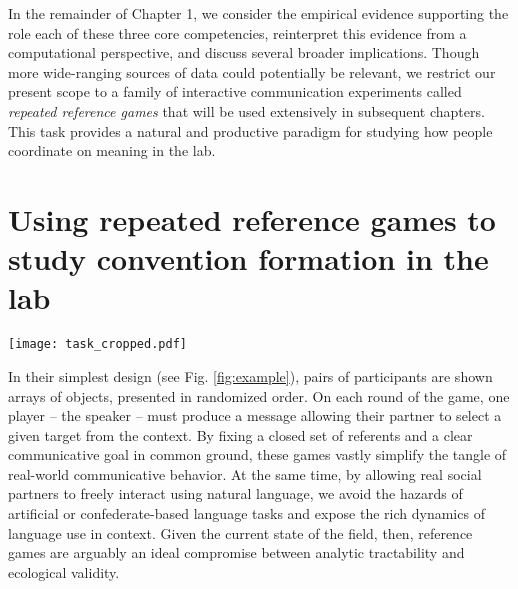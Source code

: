 In the remainder of Chapter 1, we consider the empirical evidence supporting the role each of these three core competencies, reinterpret this evidence from a computational perspective, and discuss several broader implications. 
Though more wide-ranging sources of data could potentially be relevant, we restrict our present scope to a family of interactive communication experiments called \emph{repeated reference games} that will be used extensively in subsequent chapters. 
This task provides a natural and productive paradigm for studying how people coordinate on meaning in the lab. 

\section{Using repeated reference games to study convention formation in the lab}

\begin{figure*}[t!]
\centering
\texttt{[image: task\_cropped.pdf]}
\caption{Generic setup for repeated reference game task in the lab using stimuli from Wilkes-Gibbs \& Clark (1986); on every round, the speaker refers to each target in some context, and the listener attempts to pick out the intended referent. Both players are free to speak at any time.}
\label{fig:example}
\end{figure*}

In their simplest design (see Fig. \ref{fig:example}), pairs of participants are shown arrays of objects, presented in randomized order. On each round of the game, one player -- the speaker -- must produce a message allowing their partner to select a given target from the context. By fixing a closed set of referents and a clear communicative goal in common ground, these games vastly simplify the tangle of real-world communicative behavior. At the same time, by allowing real social partners to freely interact using natural language, we avoid the hazards of artificial or confederate-based language tasks \cite{KuhlenBrennan13_LanguageInDialogue} and expose the rich dynamics of language use in context. Given the current state of the field, then, reference games are arguably an ideal compromise between analytic tractability and ecological validity. 

